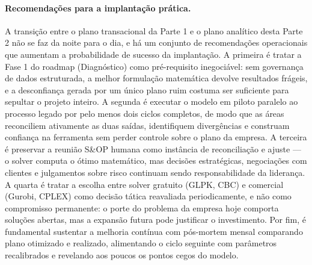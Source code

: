 \documentclass[11pt,a4paper]{article}
\begin{document}
\paragraph{Recomendações para a implantação prática.}
A transição entre o plano transacional da Parte 1 e o plano analítico desta Parte 2 não se faz da noite para o dia, e há um conjunto de recomendações operacionais que aumentam a probabilidade de sucesso da implantação. A primeira é tratar a Fase 1 do roadmap (Diagnóstico) como pré-requisito inegociável: sem governança de dados estruturada, a melhor formulação matemática devolve resultados frágeis, e a desconfiança gerada por um único plano ruim costuma ser suficiente para sepultar o projeto inteiro. A segunda é executar o modelo em piloto paralelo ao processo legado por pelo menos dois ciclos completos, de modo que as áreas reconciliem ativamente as duas saídas, identifiquem divergências e construam confiança na ferramenta sem perder controle sobre o plano da empresa. A terceira é preservar a reunião S\&OP humana como instância de reconciliação e ajuste --- o solver computa o ótimo matemático, mas decisões estratégicas, negociações com clientes e julgamentos sobre risco continuam sendo responsabilidade da liderança. A quarta é tratar a escolha entre solver gratuito (GLPK, CBC) e comercial (Gurobi, CPLEX) como decisão tática reavaliada periodicamente, e não como compromisso permanente: o porte do problema da empresa hoje comporta soluções abertas, mas a expansão futura pode justificar o investimento. Por fim, é fundamental sustentar a melhoria contínua com pós-mortem mensal comparando plano otimizado e realizado, alimentando o ciclo seguinte com parâmetros recalibrados e revelando aos poucos os pontos cegos do modelo.
\end{document}
